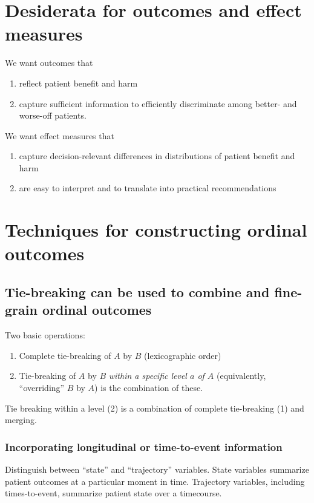 \documentclass[
  11pt,
  fleqn
]{article}
\begin{document}
\section{Desiderata for outcomes and effect measures}

We want outcomes that
\begin{enumerate}
  \item reflect patient benefit and harm
  \item capture sufficient information to efficiently discriminate
    among better- and
    worse-off patients.
\end{enumerate}

We want effect measures that
\begin{enumerate}
  \item capture decision-relevant differences in distributions of
    patient benefit and harm
  \item are easy to interpret and to translate into practical recommendations
\end{enumerate}

\section{Techniques for constructing ordinal outcomes}

\subsection{Tie-breaking can be used to combine and fine-grain ordinal outcomes}

Two basic operations:
\begin{enumerate}
  \item Complete tie-breaking of $A$ by
    $B$ (lexicographic order)
  \item Tie-breaking of $A$ by $B$ \emph{within a
    specific level $a$ of $A$} (equivalently, ``overriding'' $B$ by $A$) is the
    combination of these.
\end{enumerate}

Tie breaking within a level (2) is a combination of complete
tie-breaking (1) and merging.

\subsubsection{Incorporating longitudinal or time-to-event information}

Distinguish between ``state'' and ``trajectory'' variables. State
variables summarize patient outcomes at a particular moment in time.
Trajectory variables, including times-to-event, summarize patient
state over a timecourse.
\end{document}
